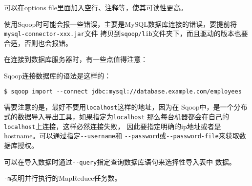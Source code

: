 可以在options file里面加入空行、注释等，使其可读性更高。

使用Sqoop时可能会报一些错误，主要是MySQL数据库连接的错误，要提前将\lstinline{mysql-connector-xxx.jar}文件
拷贝到\lstinline{sqoop/lib}文件夹下，而且驱动的版本也要合适，否则也会报错。

在连接到数据库服务器时，有一些点值得注意：

Sqoop连接数据库的语法是这样的：

\begin{lstlisting}[style=mysh,title=Sqoop连接数据库的语法]
$ sqoop import --connect jdbc:mysql://database.example.com/employees
\end{lstlisting}

需要注意的是，最好不要用\lstinline{localhost}这样的地址，因为在
Sqoop中，是一个分布式的数据导入导出工具，如果指定为\lstinline{localhost}
那么每台机器都会在自己的\lstinline{localhost}上连接，这样必然连接失败，
因此要指定明确的ip地址或者是hostname。可以通过指定\lstinline{--username}和
\lstinline{--password}或\lstinline{--password-file}来获取数据库授权。

可以在导入数据时通过\lstinline{--query}指定查询数据库语句来选择性导入表中
数据。



\lstinline{-m}表明并行执行的MapReduce任务数。
